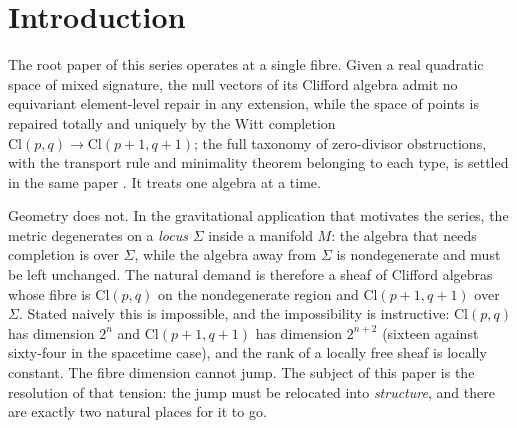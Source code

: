 \documentclass[11pt]{article}
\theoremstyle{definition}
\theoremstyle{plain}
\providecommand{\Cl}{}\renewcommand{\Cl}{\mathrm{Cl}}
\providecommand{\Sig}{}\renewcommand{\Sig}{\Sigma}
\begin{document}
\noindent{}
\newpage

\section{Introduction}

\label{c:note.sheaf.setting-introduction}
The root paper of this series operates at a single fibre. Given a real quadratic space of mixed signature, the null vectors of its Clifford algebra admit no equivariant element-level repair in any extension, while the space of points is repaired totally and uniquely by the Witt completion $\Cl(p,q) \to \Cl(p{+}1,q{+}1)$; the full taxonomy of zero-divisor obstructions, with the transport rule and minimality theorem belonging to each type, is settled in the same paper \cite{ButlerT1}. It treats one algebra at a time.

Geometry does not. In the gravitational application that motivates the series, the metric degenerates on a \emph{locus} $\Sig$ inside a manifold $M$: the algebra that needs completion is over $\Sig$, while the algebra away from $\Sig$ is nondegenerate and must be left unchanged. The natural demand is therefore a sheaf of Clifford algebras whose fibre is $\Cl(p,q)$ on the nondegenerate region and $\Cl(p{+}1,q{+}1)$ over $\Sig$. Stated naively this is impossible, and the impossibility is instructive: $\Cl(p,q)$ has dimension $2^n$ and $\Cl(p{+}1,q{+}1)$ has dimension $2^{n+2}$ (sixteen against sixty-four in the spacetime case), and the rank of a locally free sheaf is locally constant. The fibre dimension cannot jump. The subject of this paper is the resolution of that tension: the jump must be relocated into \emph{structure}, and there are exactly two natural places for it to go.
\end{document}

